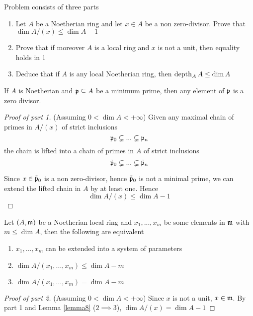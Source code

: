 \begin{problem}
	\label{problem6}
	Problem consists of three parts
	\begin{enumerate}
		\item Let $A$ be a Noetherian ring and let $x \in A$ be a non zero-divisor. Prove that $\dim A / (x) \leq \dim A - 1$
		
		\item Prove that if moreover $A$ is a local ring and $x$ is not a unit, then equality holds in 1

		\item Deduce that if $A$ is any local Noetherian ring, then $\operatorname{depth}_A A \leq \dim A$
	\end{enumerate}
\end{problem}

\begin{lemma}
	If $A$ is Noetherian and $\mathfrak{p} \subseteq A$ be a minimum prime, then any element of $\mathfrak{p}$ is a zero divisor.
\end{lemma}



\begin{proof}[Proof of part 1]
	(Assuming $0 < \dim A < +\infty$) Given any maximal chain of primes in $A / (x)$ of strict inclusions
	$$
		\mathfrak{p}_0 \subsetneq ... \subsetneq \mathfrak{p}_n
	$$
	the chain is  lifted into a chain of primes in $A$ of strict inclusions
	$$
		\tilde{\mathfrak{p}}_0 \subsetneq ... \subsetneq \tilde{\mathfrak{p}}_n
	$$
	
	Since $x \in \tilde{\mathfrak{p}}_0$ is a non zero-divisor, hence $\tilde{\mathfrak{p}}_0$ is not a minimal prime, we can extend the lifted chain in $A$ by at least one. Hence
	$$
		\dim A / (x) \leq \dim A - 1
	$$
\end{proof}

\begin{lemma}
	\label{lemma8}
	Let $(A, \mathfrak{m})$ be a Noetherian local ring and $x_1, ..., x_m$ be some elements in $\mathfrak{m}$ with $m \leq \dim A$, then the following are equivalent
	\begin{enumerate}
		\item $x_1, ..., x_m$ can be extended into a system of parameters
		\item $\dim A / (x_1, ..., x_m) \leq \dim A - m$
		\item $\dim A / (x_1, ..., x_m) = \dim A - m$
	\end{enumerate}
\end{lemma}

\begin{proof}[Proof of part 2]
	(Assuming $0 < \dim A < +\infty$) Since $x$ is not a unit, $x \in \mathfrak{m}$. By part 1 and Lemma \ref{lemma8} ($2 \implies 3$), $\dim A / (x) = \dim A - 1$
\end{proof}


